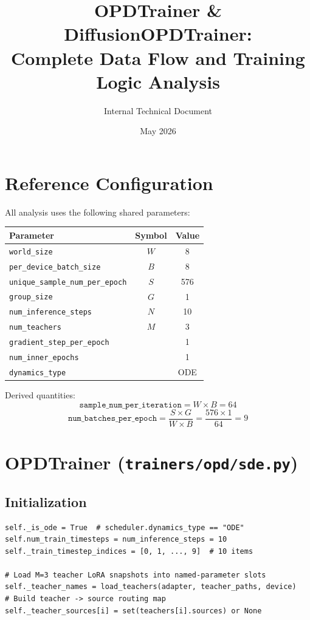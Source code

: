 \documentclass[11pt]{article}
\title{OPDTrainer \& DiffusionOPDTrainer:\\Complete Data Flow and Training Logic Analysis}
\author{Internal Technical Document}
\date{May 2026}
\begin{document}
\maketitle
\tableofcontents
\newpage

\section{Reference Configuration}

All analysis uses the following shared parameters:

\begin{table}[h]
\centering
\begin{tabular}{lcc}
\toprule
Parameter & Symbol & Value \\
\midrule
\texttt{world\_size} & $W$ & 8 \\
\texttt{per\_device\_batch\_size} & $B$ & 8 \\
\texttt{unique\_sample\_num\_per\_epoch} & $S$ & 576 \\
\texttt{group\_size} & $G$ & 1 \\
\texttt{num\_inference\_steps} & $N$ & 10 \\
\texttt{num\_teachers} & $M$ & 3 \\
\texttt{gradient\_step\_per\_epoch} & & 1 \\
\texttt{num\_inner\_epochs} & & 1 \\
\texttt{dynamics\_type} & & ODE \\
\bottomrule
\end{tabular}
\end{table}

Derived quantities:
\[
\texttt{sample\_num\_per\_iteration} = W \times B = 64
\]
\[
\texttt{num\_batches\_per\_epoch} = \frac{S \times G}{W \times B} = \frac{576 \times 1}{64} = 9
\]

\section{OPDTrainer (\texttt{trainers/opd/sde.py})}

\subsection{Initialization}

\begin{lstlisting}
self._is_ode = True  # scheduler.dynamics_type == "ODE"
self.num_train_timesteps = num_inference_steps = 10
self._train_timestep_indices = [0, 1, ..., 9]  # 10 items

# Load M=3 teacher LoRA snapshots into named-parameter slots
self._teacher_names = load_teachers(adapter, teacher_paths, device)
# Build teacher -> source routing map
self._teacher_sources[i] = set(teachers[i].sources) or None
\end{lstlisting}
\end{document}
